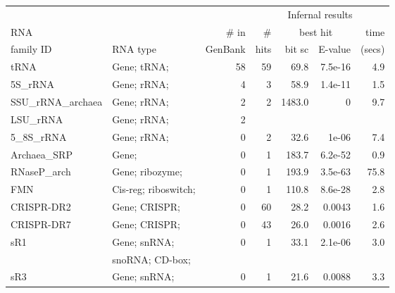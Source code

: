 \begin{small}
\begin{table}
\label{tbl:results}
\begin{center}
\begin{tabular}{|l|l|r|r|rr|r|} \hline
                                &                      &         & \multicolumn{4}{c|}{Infernal results} \\ \cline {4-7}
RNA                             &                      & \# in   & \#       & \multicolumn{2}{c|}{best hit} & time \\ \cline{5-6}     
family ID                       & RNA type             & GenBank & hits     & bit sc & E-value  &      (secs) \\ \hline
tRNA                            &  Gene; tRNA;         &    58  &       59  &   69.8 &  7.5e-16 &      4.9 \\
5S\_rRNA                        &  Gene; rRNA;         &     4  &        3  &   58.9 &  1.4e-11 &      1.5 \\
SSU\_rRNA\_archaea              &  Gene; rRNA;         &     2  &        2  &  1483.0&        0 &      9.7 \\
LSU\_rRNA                       &  Gene; rRNA;         &     2  &           &        &          &          \\
5\_8S\_rRNA                     &  Gene; rRNA;         &     0  &        2  &   32.6 &    1e-06 &      7.4 \\
Archaea\_SRP                    &  Gene;               &     0  &        1  &  183.7 &  6.2e-52 &      0.9 \\
RNaseP\_arch                    &  Gene; ribozyme;     &     0  &        1  &  193.9 &  3.5e-63 &     75.8 \\
FMN                             &  Cis-reg; riboswitch;&     0  &        1  &  110.8 &  8.6e-28 &      2.8 \\
CRISPR-DR2                      &  Gene; CRISPR;       &     0  &       60  &   28.2 &   0.0043 &      1.6 \\
CRISPR-DR7                      &  Gene; CRISPR;       &     0  &       43  &   26.0 &   0.0016 &      2.6 \\
sR1                             &  Gene; snRNA;        &     0  &        1  &   33.1 &  2.1e-06 &      3.0 \\
                                &  snoRNA; CD-box;     &        &           &        &          &          \\
sR3                             &  Gene; snRNA;        &     0  &        1  &   21.6 &   0.0088 &      3.3 \\

\end{tabular}
\end{center}
\end{table}
\end{small}

